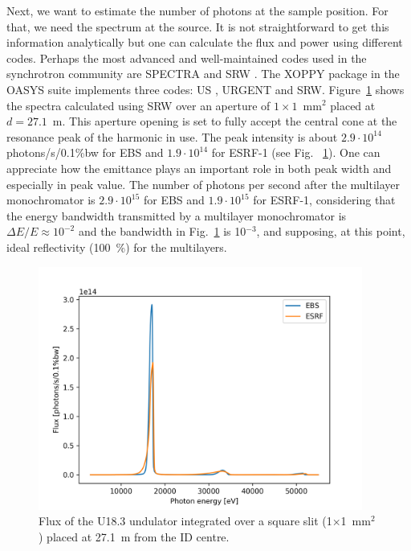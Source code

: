 \documentclass{iucr}              %
\newcommand{\inred}[1]{{\color{black}#1}}
\begin{document}
Next, we want to estimate the number of photons at the sample position. For that, we need the spectrum at the source. It is not straightforward to get this information analytically but one can calculate the flux and power using different codes. Perhaps the most advanced and well-maintained codes used in the synchrotron community are SPECTRA \cite{codeSPECTRA} and SRW \cite{codeSRW}. The XOPPY package in the OASYS suite implements three codes: US \cite{codeUS}, URGENT \cite{codeURGENT} and SRW. Figure~\ref{fig:FluxU18} shows the spectra calculated using SRW over an aperture of $1 \times 1$~mm$^2$ placed at $d=27.1$~m. This aperture opening is set to fully accept the central cone at the resonance peak of the harmonic in use.
The peak intensity is about  $2.9\cdot10^{14}$ photons/s/0.1{\%}bw for EBS and $1.9\cdot10^{14}$ for ESRF-1 (see \inred{Fig.~} \ref{fig:FluxU18}). One can appreciate how the emittance plays an important role in both peak width and especially in peak value. The number of photons per second after the multilayer monochromator is $2.9\cdot10^{15}$ for EBS and $1.9\cdot10^{15}$ for ESRF-1, considering that the energy bandwidth transmitted by a multilayer monochromator is $\Delta E/E \approx 10^{-2}$ and the bandwidth in Fig.~\ref{fig:FluxU18} is 10$^{-3}$, and supposing, at this point, ideal reflectivity (100~\%) for the multilayers. 

\begin{figure}\label{fig:FluxU18}
    \centering
    \includegraphics[width=0.95\textwidth]{GRAPHICS/fluxU18.png}
    \caption{Flux of the U18.3 undulator integrated over a square slit \inred{(1$\times$1~mm$^2$)} placed at 27.1~m from the ID centre.}
\end{figure}
\end{document}
